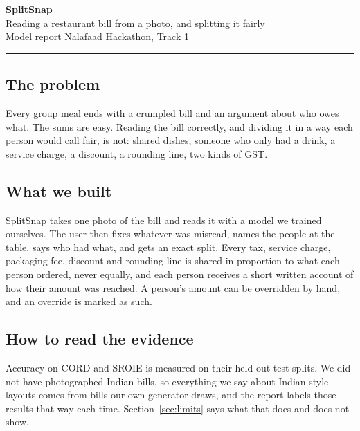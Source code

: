 \documentclass[10pt,a4paper]{article}
\begin{document}
\thispagestyle{empty}
{\fontsize{30}{34}\selectfont\bfseries SplitSnap}\\[3pt]
{\Large Reading a restaurant bill from a photo, and splitting it fairly}\\[3pt]
{\large Model report \quad Nalafaad Hackathon, Track 1}
\vspace{5pt}\hrule\vspace{9pt}

\subsection*{The problem}
Every group meal ends with a crumpled bill and an argument about who owes what. The sums are easy. Reading the bill correctly, and dividing it in a way each person would call fair, is not: shared dishes, someone who only had a drink, a service charge, a discount, a rounding line, two kinds of GST.

\subsection*{What we built}
SplitSnap takes one photo of the bill and reads it with a model we trained ourselves. The user then fixes whatever was misread, names the people at the table, says who had what, and gets an exact split. Every tax, service charge, packaging fee, discount and rounding line is shared in proportion to what each person ordered, never equally, and each person receives a short written account of how their amount was reached. A person's amount can be overridden by hand, and an override is marked as such.

\subsection*{How to read the evidence}
Accuracy on CORD and SROIE is measured on their held-out test splits. We did not have photographed Indian bills, so everything we say about Indian-style layouts comes from bills our own generator draws, and the report labels those results that way each time. Section~\ref{sec:limits} says what that does and does not show.
\end{document}
